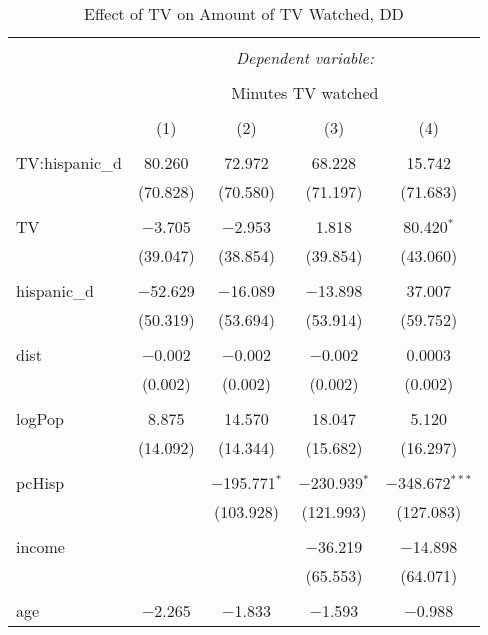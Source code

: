 
\begin{table}[!htbp] \centering 
  \caption{Effect of TV on Amount of TV Watched, DD} 
  \label{} 
\begin{tabular}{@{\extracolsep{-5pt}}lcccc} 
\\[-1.8ex]\hline 
\hline \\[-1.8ex] 
 & \multicolumn{4}{c}{\textit{Dependent variable:}} \\ 
\cline{2-5} 
\\[-1.8ex] & \multicolumn{4}{c}{Minutes TV watched} \\ 
\\[-1.8ex] & (1) & (2) & (3) & (4)\\ 
\hline \\[-1.8ex] 
 TV:hispanic\_d & 80.260 & 72.972 & 68.228 & 15.742 \\ 
  & (70.828) & (70.580) & (71.197) & (71.683) \\ 
  & & & & \\ 
 TV & $-$3.705 & $-$2.953 & 1.818 & 80.420$^{*}$ \\ 
  & (39.047) & (38.854) & (39.854) & (43.060) \\ 
  & & & & \\ 
 hispanic\_d & $-$52.629 & $-$16.089 & $-$13.898 & 37.007 \\ 
  & (50.319) & (53.694) & (53.914) & (59.752) \\ 
  & & & & \\ 
 dist & $-$0.002 & $-$0.002 & $-$0.002 & 0.0003 \\ 
  & (0.002) & (0.002) & (0.002) & (0.002) \\ 
  & & & & \\ 
 logPop & 8.875 & 14.570 & 18.047 & 5.120 \\ 
  & (14.092) & (14.344) & (15.682) & (16.297) \\ 
  & & & & \\ 
 pcHisp &  & $-$195.771$^{*}$ & $-$230.939$^{*}$ & $-$348.672$^{***}$ \\ 
  &  & (103.928) & (121.993) & (127.083) \\ 
  & & & & \\ 
 income &  &  & $-$36.219 & $-$14.898 \\ 
  &  &  & (65.553) & (64.071) \\ 
  & & & & \\ 
 age & $-$2.265 & $-$1.833 & $-$1.593 & $-$0.988 \\ 

\end{tabular}
\end{table}
